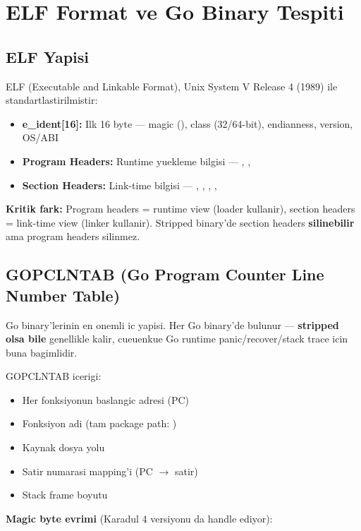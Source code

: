 \section{ELF Format ve Go Binary Tespiti}
\label{sec:elf-go}

\subsection{ELF Yapisi}

ELF (Executable and Linkable Format), Unix System V Release 4 (1989) ile standartlastirilmistir:

\begin{itemize}
\item \textbf{e\_ident[16]:} Ilk 16 byte --- magic (), class (32/64-bit), endianness, version, OS/ABI
\item \textbf{Program Headers:} Runtime yuekleme bilgisi --- , , 
\item \textbf{Section Headers:} Link-time bilgisi --- , , , , 
\end{itemize}

\textbf{Kritik fark:} Program headers = runtime view (loader kullanir), section headers = link-time view (linker kullanir). Stripped binary'de section headers \textbf{silinebilir} ama program headers silinmez.

\subsection{GOPCLNTAB (Go Program Counter Line Number Table)}

Go binary'lerinin en onemli ic yapisi. Her Go binary'de bulunur --- \textbf{stripped olsa bile} genellikle kalir, cueuenkue Go runtime panic/recover/stack trace icin buna bagimlidir.

GOPCLNTAB icerigi:
\begin{itemize}
\item Her fonksiyonun baslangic adresi (PC)
\item Fonksiyon adi (tam package path: )
\item Kaynak dosya yolu
\item Satir numarasi mapping'i (PC $\to$ satir)
\item Stack frame boyutu
\end{itemize}

\textbf{Magic byte evrimi} (Karadul 4 versiyonu da handle ediyor):

